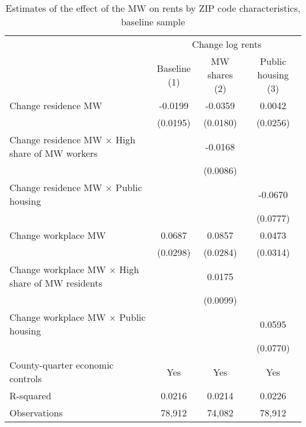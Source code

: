 \begin{table}[hbt!] \centering
    \caption{Estimates of the effect of the MW on rents by ZIP code characteristics, baseline sample}
    \label{tab:heterogeneity}
    \begin{tabular}{@{}lccc@{}}
        \toprule
            & \multicolumn{3}{c}{Change log rents}                                                  \\ \cmidrule(l){2-4} 
            & \shortstack{Baseline\\(1)} 
            & \shortstack{MW shares\\(2)}                                             
            & \shortstack{Public housing\\(3)}                                                      \\ \midrule
        Change residence MW                                     &  -0.0199   &  -0.0359  &  0.0042   \\
                                                                & (0.0195)  & (0.0180) & (0.0256)  \\
        Change residence MW $\times$ High share of MW workers   &        &  -0.0168  &        \\
                                                                &        & (0.0086) &        \\
        Change residence MW $\times$ Public housing             &        &       &  -0.0670   \\
                                                                &        &       & (0.0777)  \\
        Change workplace MW                                     &  0.0687   &  0.0857  &  0.0473   \\
                                                                & (0.0298)  & (0.0284) & (0.0314)  \\
        Change workplace MW $\times$ High share of MW residents &        &  0.0175  &        \\
                                                                &        & (0.0099) &        \\
        Change workplace MW $\times$ Public housing             &        &       &  0.0595   \\
                                                                &        &       & (0.0770)  \\
        County-quarter economic controls                        &  Yes   &  Yes  &   Yes  \\
        R-squared                                               &  0.0216   &  0.0214  &   0.0226  \\
        Observations                                            &  78,912  &  74,082 &   78,912 \\ \bottomrule
    \end{tabular}


\end{table}
